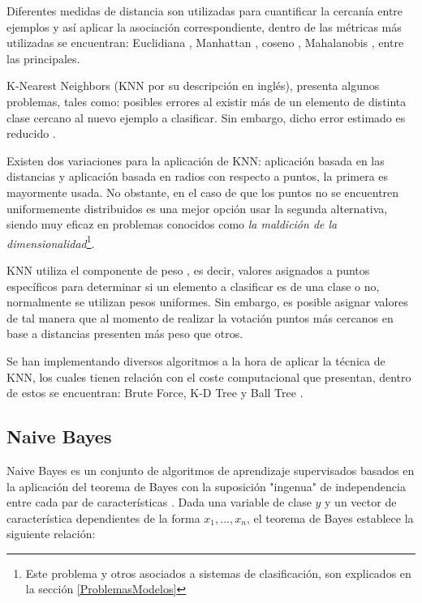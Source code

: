 Diferentes medidas de distancia son utilizadas para cuantificar la cercanía entre ejemplos y así aplicar la asociación correspondiente, dentro de las métricas más utilizadas se encuentran: Euclidiana \cite{DANIELSSON1980227}, Manhattan \cite{PERLIBAKAS2004711}, coseno \cite{LIAO20155328}, Mahalanobis \cite{DEMAESSCHALCK20001}, entre las principales.


K-Nearest Neighbors (KNN por su descripción en inglés), presenta algunos problemas, tales como: posibles errores al existir más de un elemento de distinta clase cercano al nuevo ejemplo a clasificar. Sin embargo, dicho error estimado es reducido \cite{6313426}.
 
Existen dos variaciones para la aplicación de KNN: aplicación basada en las distancias y aplicación basada en radios con respecto a puntos, la primera es mayormente usada. No obstante, en el caso de que los puntos no se encuentren uniformemente distribuidos es una mejor opción usar la segunda alternativa, siendo muy eficaz en problemas conocidos como \textit{la maldición de la dimensionalidad}\footnote{Este problema y otros asociados a sistemas de clasificación, son explicados en la sección \ref{ProblemasModelos}}. 

KNN utiliza el componente de peso \cite{TAN2005667}, es decir, valores asignados a puntos específicos para determinar si un elemento a clasificar es de una clase o no, normalmente se utilizan pesos uniformes. Sin embargo, es posible asignar valores de tal manera que al momento de realizar la votación puntos más cercanos en base a distancias presenten más peso que otros.

Se han implementando diversos algoritmos a la hora de aplicar la técnica de KNN, los cuales tienen relación con el coste computacional que presentan, dentro de estos se encuentran: Brute Force, K-D Tree y Ball Tree \cite{pedregosa2011scikit}.

\subsection{Naive Bayes}

Naive Bayes es un conjunto de algoritmos de aprendizaje supervisados basados en la aplicación del teorema de Bayes con la suposición "ingenua" de independencia entre cada par de características \cite{zhang2004optimality}. Dada una variable de clase $y$ y un vector de característica dependientes de la forma $x_1,..., x_n$, el teorema de Bayes establece la siguiente relación:

